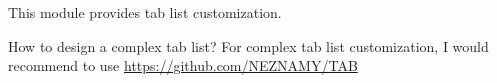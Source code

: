 
This module provides tab list customization.

\begin{note}{How to design a complex tab list?}
    For complex tab list customization, I would recommend to use \url{https://github.com/NEZNAMY/TAB}
\end{note}